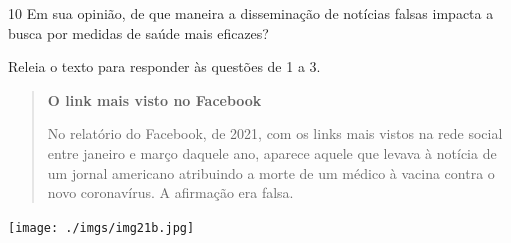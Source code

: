 \num{10} Em sua opinião, de que maneira a disseminação de notícias falsas
impacta a busca por medidas de saúde mais eficazes?


\pagebreak
{}

Releia o texto para responder às questões de 1 a 3.\medskip

\begin{minipage}{.5\textwidth}
\begin{quote}
\textbf{O link mais visto no Facebook}

No relatório do Facebook, de 2021, com os links mais vistos na rede social
entre janeiro e março daquele ano, aparece aquele que levava à notícia
de um jornal americano atribuindo a morte de um médico à vacina contra
o novo coronavírus. A afirmação era falsa.
\end{quote}
\end{minipage}\hspace{1cm}
\begin{minipage}{.5\textwidth}
\texttt{[image: ./imgs/img21b.jpg]}
\end{minipage}

